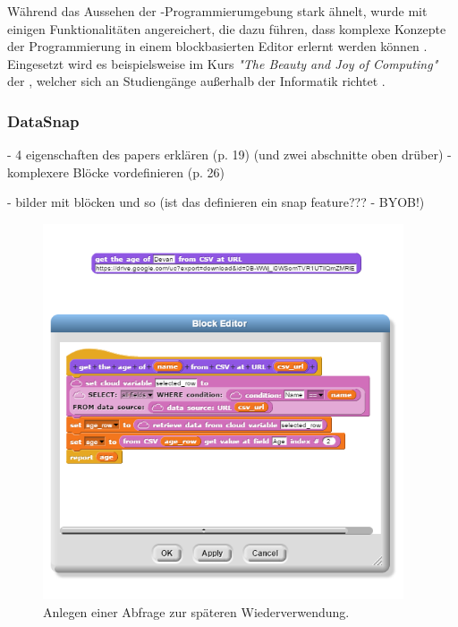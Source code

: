 Während das Aussehen der \Snap{}-Programmierumgebung \Scratch stark ähnelt, wurde \Snap{} mit einigen Funktionalitäten angereichert, die dazu führen, dass komplexe Konzepte der Programmierung in einem blockbasierten Editor erlernt werden können \parencite{ballSnapLook2019}. Eingesetzt wird es beispielsweise im Kurs \textit{"The Beauty and Joy of Computing"} der \citeauthor{universityofcaliforniaberkeleySnapBuild}, welcher sich an Studiengänge außerhalb der Informatik richtet \parencite{universityofcaliforniaberkeleySnapBuild}.

\subsubsection{DataSnap}
- 4 eigenschaften des papers erklären (p. 19) (und zwei abschnitte oben drüber)
- komplexere Blöcke vordefinieren (p. 26)

- bilder mit blöcken und so (ist das definieren ein snap feature??? - BYOB!)

\begin{figure}[!ht]
  \centering
    \includegraphics[width=0.95\textwidth]{assets/datasnap-block-definition.png}
  \caption{Anlegen einer Abfrage zur späteren Wiederverwendung. \parencite{hellmannDataSnapEnabling2015}}
  \label{fig:datasnap-block-definition}
\end{figure}

